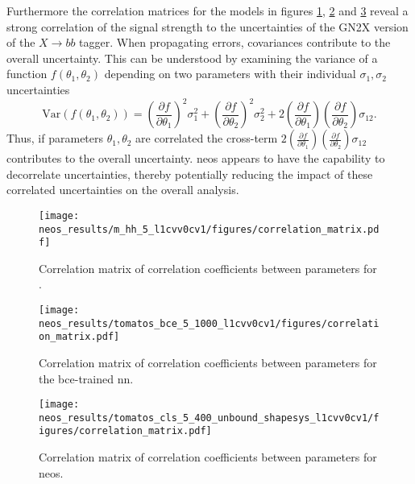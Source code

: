 Furthermore the correlation matrices for the models in figures \ref{fig:correlation_matrix_m_hh}, \ref{fig:correlation_matrix_bce} and \ref{fig:correlation_matrix_cls} reveal a strong correlation of the signal strength to the uncertainties of the GN2X version of the $X\rightarrow bb$ tagger. When propagating errors, covariances contribute to the overall uncertainty. This can be understood by examining the variance of a function $f(\theta_1, \theta_2)$ depending on two parameters with their individual $\sigma_1,\sigma_2$ uncertainties
\begin{equation}
    \text{Var}(f(\theta_1, \theta_2)) = \left( \frac{\partial f}{\partial \theta_1} \right)^2 \sigma_1^2 + \left( \frac{\partial f}{\partial \theta_2} \right)^2 \sigma_2^2 + 2 \left( \frac{\partial f}{\partial \theta_1} \right) \left( \frac{\partial f}{\partial \theta_2} \right) \sigma_{12}.
\end{equation}
Thus, if parameters $\theta_1, \theta_2$ are correlated the cross-term \(2 \left( \frac{\partial f}{\partial \theta_1} \right) \left( \frac{\partial f}{\partial \theta_2} \right) \sigma_{12}\) contributes to the overall uncertainty. \ac{neos} appears to have the capability to decorrelate uncertainties, thereby potentially reducing the impact of these correlated uncertainties on the overall analysis. 

\begin{figure}
    \centering
    \texttt{[image: neos\_results/m\_hh\_5\_l1cvv0cv1/figures/correlation\_matrix.pdf]}
    \caption[]{Correlation matrix of correlation coefficients between parameters for \mhh.}
    \label{fig:correlation_matrix_m_hh}
\end{figure}
\begin{figure}
    \centering
    \texttt{[image: neos\_results/tomatos\_bce\_5\_1000\_l1cvv0cv1/figures/correlation\_matrix.pdf]}
    \caption[]{Correlation matrix of correlation coefficients between parameters for the \ac{bce}-trained \ac{nn}.}
    \label{fig:correlation_matrix_bce}
\end{figure}
\begin{figure}
    \centering
    \texttt{[image: neos\_results/tomatos\_cls\_5\_400\_unbound\_shapesys\_l1cvv0cv1/figures/correlation\_matrix.pdf]}
    \caption[]{Correlation matrix of correlation coefficients between parameters for \ac{neos}.}
    \label{fig:correlation_matrix_cls}
\end{figure}

